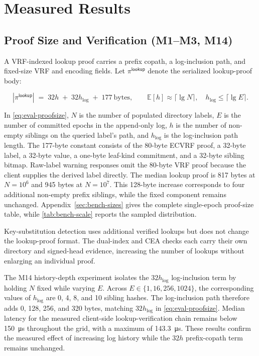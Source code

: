 \section{Measured Results}\label{sec:eval-micro}

\subsection{Proof Size and Verification (M1--M3, M14)}\label{ssec:eval-sizes}\label{ssec:eval-latency}

A VRF-indexed lookup proof carries a prefix copath, a log-inclusion path, and fixed-size VRF and
encoding fields. Let $\pi^{\mathsf{lookup}}$ denote the serialized lookup-proof body:

\begin{equation}\label{eq:eval-proofsize}
  |\pi^{\mathsf{lookup}}| \;=\; 32h \;+\; 32h_{\mathrm{log}} \;+\; 177 \ \text{bytes},
  \qquad \mathbb{E}[h]\approx\lceil\lg N\rceil,\quad
  h_{\mathrm{log}}\le\lceil\lg E\rceil.
\end{equation}

In \cref{eq:eval-proofsize}, $N$ is the number of populated directory labels, $E$ is the number of
committed epochs in the append-only log, $h$ is the number of non-empty siblings on the queried
label's path, and $h_{\mathrm{log}}$ is the log-inclusion path length. The \num{177}-byte constant
consists of the \num{80}-byte ECVRF proof, a \num{32}-byte label, a \num{32}-byte value, a one-byte
leaf-kind commitment, and a \num{32}-byte sibling bitmap. Raw-label warning responses omit the
\num{80}-byte VRF proof because the client supplies the derived label directly. The median lookup
proof is \num{817} bytes at $N=10^{6}$ and \num{945} bytes at $N=10^{7}$. This \num{128}-byte
increase corresponds to four additional non-empty prefix siblings, while the fixed component
remains unchanged. Appendix~\ref{sec:bench-sizes} gives the complete single-epoch proof-size table,
while \cref{tab:bench-scale} reports the sampled distribution.

Key-substitution detection uses additional verified lookups but does not change the lookup-proof
format. The dual-index and CEA checks each carry their own directory and signed-head evidence,
increasing the number of lookups without enlarging an individual proof.

The M14 history-depth experiment isolates the $32h_{\mathrm{log}}$ log-inclusion term by holding
$N$ fixed while varying $E$. Across $E\in\{1,16,256,1024\}$, the corresponding values of
$h_{\mathrm{log}}$ are \num{0}, \num{4}, \num{8}, and \num{10} sibling hashes. The log-inclusion
path therefore adds \num{0}, \num{128}, \num{256}, and \num{320} bytes, matching
$32h_{\mathrm{log}}$ in \cref{eq:eval-proofsize}. Median latency for the measured client-side
lookup-verification chain remains below \SI{150}{\micro\second} throughout the grid, with a maximum of
\SI{143.3}{\micro\second}. These results confirm the measured effect of increasing log history while
the $32h$ prefix-copath term remains unchanged.

